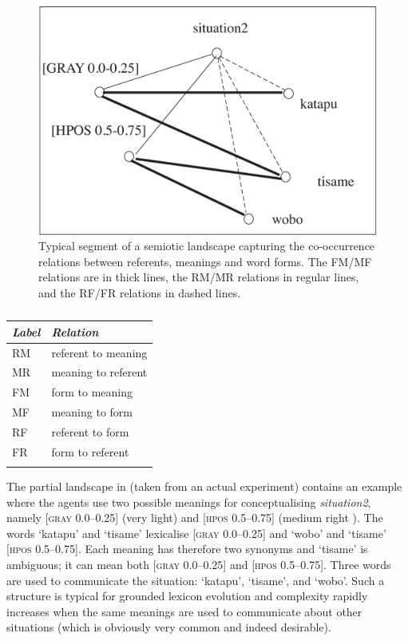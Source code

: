 \begin{figure}[htbp]
  \centerline{\includegraphics[width=.65\textwidth]{chap7/figs/landscape.pdf}}
\caption{\label{RMF1}Typical segment of a semiotic
landscape capturing the co-occurrence relations between
referents, meanings and word forms. The FM/MF relations are
in thick lines, the RM/MR relations in regular lines, and 
the RF/FR relations in dashed lines.}
\end{figure}
 
\begin{center}
\begin{table}
\begin{tabular}{ l  l  }
\lsptoprule
{\itshape Label}& {\itshape Relation } \\ \midrule
RM & referent to meaning \\ 
MR & meaning to referent \\ 
FM & form to meaning\\ 
MF & meaning to form\\ 
RF & referent to form \\ 
FR & form to referent  \\ 
\lspbottomrule
\end{tabular}
\caption{\label{tab:7labelrelation}}
\end{table}
\end{center}

The partial landscape in  (taken from
an actual experiment) contains an example where the agents use
two possible meanings for conceptualising {\itshape situation2}, namely
[\textsc{gray} 0.0–0.25] (very light) and [\textsc{hpos} 0.5–0.75]
(medium right ). The words `katapu' and `tisame' lexicalise
[\textsc{gray} 0.0–0.25] and `wobo' and `tisame' [\textsc{hpos} 0.5–0.75]. 
Each meaning has therefore two synonyms and `tisame' is 
ambiguous; it can mean both [\textsc{gray} 0.0–0.25]
and [\textsc{hpos} 0.5–0.75]. Three words
are used to communicate the situation: `katapu', `tisame', 
and `wobo'. Such a structure is typical for grounded
lexicon evolution and complexity rapidly increases when the
same meanings are used to communicate about other
situations (which is obviously very common and indeed desirable). 

